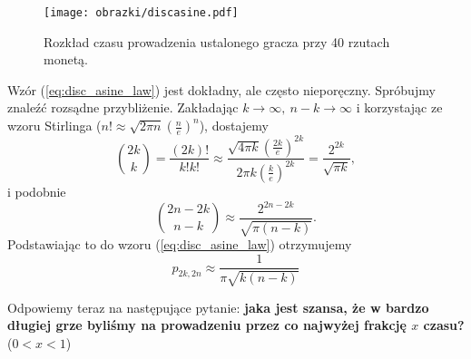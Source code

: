 \documentclass[a4paper,11pt,oneside]{book}
\newcommand{\conv}{\rightarrow}
\theoremstyle{definition}
\begin{document}
\begin{figure}[ht]
 \centering
 \texttt{[image: obrazki/discasine.pdf]}
 \caption{Rozkład czasu prowadzenia ustalonego gracza przy 40 rzutach monetą.}
 \label{fig:disc_asine}
\end{figure}

Wzór (\ref{eq:disc_asine_law}) jest dokładny, ale często nieporęczny. Spróbujmy znaleźć rozsądne przybliżenie. Zakładając $k \conv \infty,\ n-k \conv \infty$ i korzystając ze wzoru Stirlinga ($n! \approx \sqrt{2\pi n} \left( \frac{n}{e} \right)^n$), dostajemy
\[ \binom{2k}{k} = \frac{(2k)!}{k! k!} \approx \frac{\sqrt{4\pi k} \left( \frac{2k}{e} \right)^{2k}}{2\pi k \left( \frac{k}{e} \right)^{2k}} = \frac{2^{2k}}{\sqrt{\pi k}}, \]
i podobnie
\[ \binom{2n-2k}{n-k} \approx \frac{2^{2n-2k}}{\sqrt{\pi (n-k)}}. \]
Podstawiając to do wzoru (\ref{eq:disc_asine_law}) otrzymujemy
\begin{equation}
  \label{eq:disc_asine_approx}
   p_{2k,2n} \approx \frac{1}{\pi \sqrt{k(n-k)}}
\end{equation}


Odpowiemy teraz na następujące pytanie: \textbf{jaka jest szansa, że w bardzo długiej grze byliśmy na prowadzeniu przez co najwyżej frakcję $x$ czasu?} ($0 < x < 1$)
\end{document}
